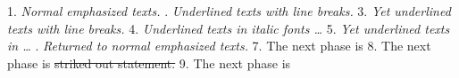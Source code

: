 \documentclass[11pt,a4paper]{article}
\begin{document}
    1. {\em Normal emphasized texts.}
    . {\em Underlined texts with line breaks.}
    3. \emph{Yet underlined texts with line breaks.}
    4. {\it{\em Underlined texts in italic fonts …}}
    5. \textit{\emph{Yet underlined texts in …}}
    . {\em Returned to normal emphasized texts.}
    7. The next phase is 
    8. The next phase is \sout{striked out statement.}
    9. The next phase is 
\end{document}
